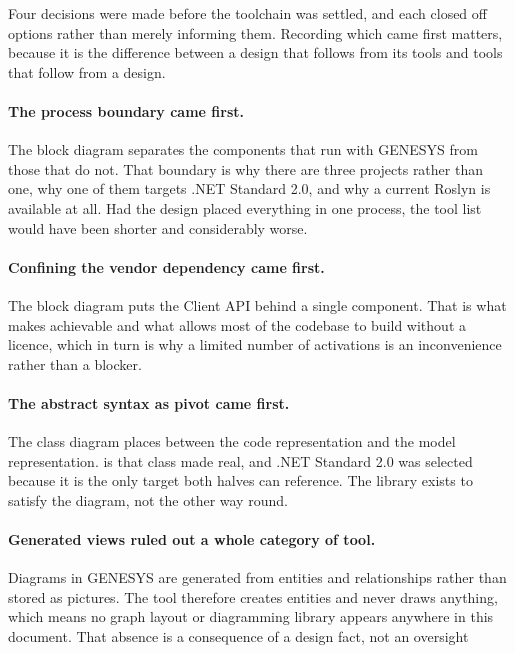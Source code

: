 Four decisions were made before the toolchain was settled, and each closed off
options rather than merely informing them. Recording which came first matters,
because it is the difference between a design that follows from its tools and
tools that follow from a design.

\paragraph{The process boundary came first.}
The block diagram separates the components that run with GENESYS from those that
do not. That boundary is why there are three projects rather than one, why one of
them targets .NET Standard 2.0, and why a current Roslyn is available at all. Had
the design placed everything in one process, the tool list would have been
shorter and considerably worse.

\paragraph{Confining the vendor dependency came first.}
The block diagram puts the Client API behind a single component. That is what
makes  achievable and what allows most of the codebase to build
without a licence, which in turn is why a limited number of activations is an
inconvenience rather than a blocker.

\paragraph{The abstract syntax as pivot came first.}
The class diagram places  between the code representation and the
model representation.  is that class made real, and
.NET Standard 2.0 was selected because it is the only target both halves can
reference. The library exists to satisfy the diagram, not the other way round.

\paragraph{Generated views ruled out a whole category of tool.}
Diagrams in GENESYS are generated from entities and relationships rather than
stored as pictures. The tool therefore creates entities and never draws anything,
which means no graph layout or diagramming library appears anywhere in this
document. That absence is a consequence of a design fact, not an oversight
